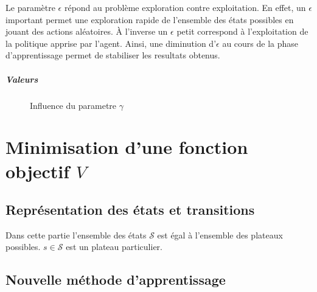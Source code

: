 \documentclass{report}
\begin{document}

Le paramètre \(\epsilon\) répond au problème exploration contre exploitation. En
effet, un \(\epsilon\) important permet une exploration rapide de l'ensemble
des états possibles en jouant des actions aléatoires. À l'inverse un \(\epsilon\)
petit correspond à l'exploitation de la politique apprise par l'agent. Ainsi,
une diminution d'\(\epsilon\) au cours de la phase d'apprentissage permet de
stabiliser les resultats obtenus.


\paragraph{Valeurs}
\begin{figure}
  \centering
  \caption{Influence du parametre \(\gamma\)}
\end{figure}



\chapter{Minimisation d'une fonction objectif \( V \)}

\section{Représentation des états et transitions}

Dans cette partie l'ensemble des états \( \mathcal{S} \) est égal à l'ensemble
des plateaux possibles. \( s \in \mathcal{S} \) est un plateau particulier.

\section{Nouvelle méthode d'apprentissage}
\end{document}
